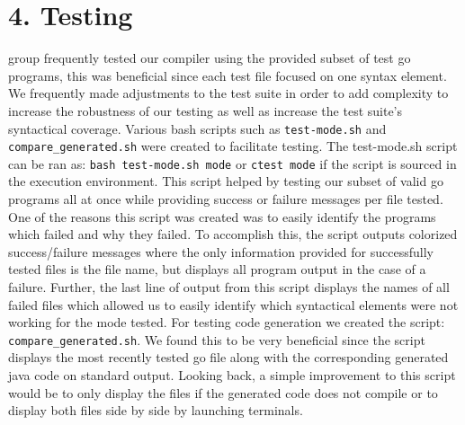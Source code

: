\documentclass{article}
\begin{document}
\section*{4. Testing}\mbox{}
 group frequently tested our compiler using the provided subset of test go programs, this was beneficial since each test file focused on one syntax element.
We frequently made adjustments to the test suite in order to add complexity to increase the robustness of our testing as well as increase the test suite's syntactical coverage.
Various bash scripts such as \texttt{test-mode.sh} and \texttt{compare\_generated.sh} were created to facilitate testing.
The test-mode.sh script can be ran as: \texttt{bash test-mode.sh mode} or \texttt{ctest mode} if the script is sourced in the execution environment.
This script helped by testing our subset of valid go programs all at once while providing success or failure messages per file tested.
One of the reasons this script was created was to easily identify the programs which failed and why they failed.
To accomplish this, the script outputs colorized success/failure messages where the only information provided for successfully tested files is the file name, but displays all program output in the case of a failure.
Further, the last line of output from this script displays the names of all failed files which allowed us to easily identify which syntactical elements were not working for the mode tested.
For testing code generation we created the script: \texttt{compare\_generated.sh}.
We found this to be very beneficial since the script displays the most recently tested go file along with the corresponding generated java code on standard output.
Looking back, a simple improvement to this script would be to only display the files if the generated code does not compile or to display both files side by side by launching terminals.
\end{document}
